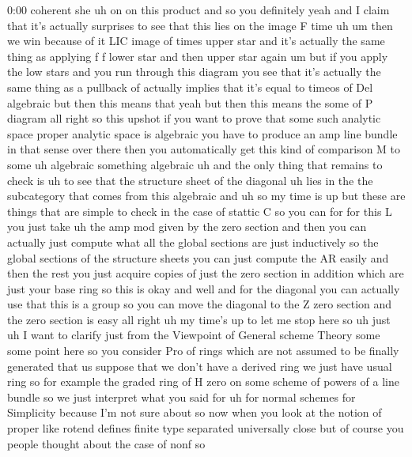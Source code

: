 \begin{unfinished}{0:00}
coherent  she
uh  on  on  this  product  and  so  you
definitely
yeah  and  I  claim  that  it's  actually
surprises  to  see  that  this  lies  on  the
image  F
time
uh  um  then  we
win  because  of  it  LIC  image  of  times
upper  star  and  it's
actually  the  same  thing  as  applying  f  f
lower  star  and  then  upper  star  again  um
but  if  you  apply  the  low  stars  and  you
run  through  this  diagram  you  see  that
it's  actually  the  same  thing  as  a
pullback
of  actually  implies  that  it's  equal  to
timeos  of  Del
algebraic
but  then  this  means  that  yeah  but  then
this  means  the  some  of  P
diagram  all  right  so  this  upshot  if  you
want  to  prove  that  some  such  analytic
space  proper  analytic  space  is  algebraic
you  have  to  produce  an  amp  line  bundle
in  that  sense  over  there  then  you
automatically  get  this  kind  of
comparison  M  to  some  uh  algebraic
something  algebraic
uh  and  the  only  thing  that  remains  to
check  is  uh  to  see  that  the  structure
sheet  of  the  diagonal  uh  lies  in  the  the
subcategory  that  comes  from  this
algebraic  and
uh  so  my  time  is  up  but  these  are  things
that  are  simple  to  check  in  the  case  of
stattic  C  so  you  can  for  for  this  L  you
just  take  uh  the  amp  mod  given  by  the
zero
section  and  then  you  can  actually  just
compute  what  all  the  global  sections  are
just  inductively  so  the  global  sections
of  the  structure  sheets  you  can  just
compute  the  AR  easily  and  then  the  rest
you  just  acquire  copies  of  just  the  zero
section  in  addition  which  are  just  your
base  ring  so  this  is  okay  and  well  and
for  the  diagonal  you  can  actually  use
that  this  is  a  group  so  you  can  move  the
diagonal  to  the  Z  zero  section  and  the
zero  section  is
easy
all  right  uh  my  time's  up  to  let  me  stop
here  so  uh  just  uh  I  want  to  clarify
just  from  the  Viewpoint  of  General
scheme  Theory  some  some  point  here  so
you  consider  Pro  of  rings  which  are  not
assumed  to  be  finally  generated  that  us
suppose  that  we  don't  have  a  derived
ring  we  just  have  usual  ring  so  for
example  the  graded  ring  of  H  zero  on
some  scheme  of  powers  of  a  line  bundle
so  we  just  interpret  what  you  said  for
uh  for  normal  schemes  for  Simplicity
because  I'm  not  sure  about  so  now  when
you  look  at  the  notion  of  proper  like
rotend  defines  finite  type  separated
universally  close  but  of  course  you
people  thought  about  the  case  of  nonf  so

\end{unfinished}
